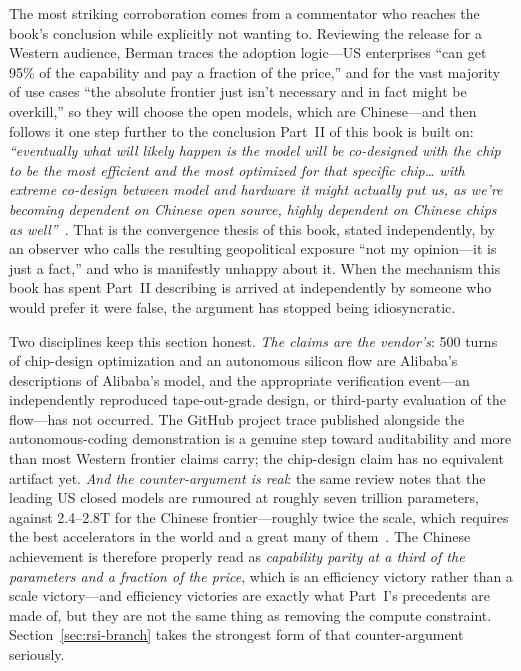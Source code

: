 The most striking corroboration comes from a commentator who reaches the book's conclusion while explicitly not wanting to. Reviewing the release for a Western audience, Berman traces the adoption logic---US enterprises ``can get 95\% of the capability and pay a fraction of the price,'' and for the vast majority of use cases ``the absolute frontier just isn't necessary and in fact might be overkill,'' so they will choose the open models, which are Chinese---and then follows it one step further to the conclusion Part~II of this book is built on: \emph{``eventually what will likely happen is the model will be co-designed with the chip to be the most efficient and the most optimized for that specific chip\ldots{} with extreme co-design between model and hardware it might actually put us, as we're becoming dependent on Chinese open source, highly dependent on Chinese chips as well''}~\cite{berman2026}. That is the convergence thesis of this book, stated independently, by an observer who calls the resulting geopolitical exposure ``not my opinion---it is just a fact,'' and who is manifestly unhappy about it. When the mechanism this book has spent Part~II describing is arrived at independently by someone who would prefer it were false, the argument has stopped being idiosyncratic.

Two disciplines keep this section honest. \emph{The claims are the vendor's}: 500 turns of chip-design optimization and an autonomous silicon flow are Alibaba's descriptions of Alibaba's model, and the appropriate verification event---an independently reproduced tape-out-grade design, or third-party evaluation of the flow---has not occurred. The GitHub project trace published alongside the autonomous-coding demonstration is a genuine step toward auditability and more than most Western frontier claims carry; the chip-design claim has no equivalent artifact yet. \emph{And the counter-argument is real}: the same review notes that the leading US closed models are rumoured at roughly seven trillion parameters, against 2.4--2.8T for the Chinese frontier---roughly twice the scale, which requires the best accelerators in the world and a great many of them~\cite{berman2026}. The Chinese achievement is therefore properly read as \emph{capability parity at a third of the parameters and a fraction of the price}, which is an efficiency victory rather than a scale victory---and efficiency victories are exactly what Part~I's precedents are made of, but they are not the same thing as removing the compute constraint. Section~\ref{sec:rsi-branch} takes the strongest form of that counter-argument seriously.

